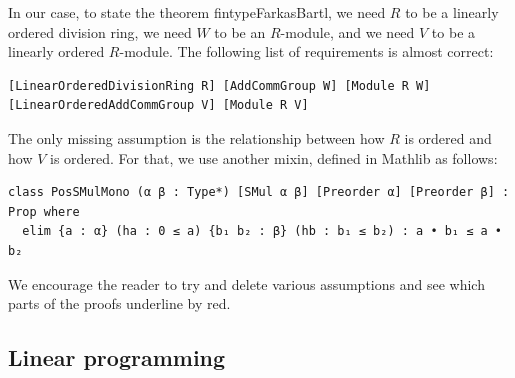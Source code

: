 \documentclass[]{article}
\renewcommand{\.}{\hskip .75pt}
\begin{document}
In our case, to state the theorem fintypeFarkasBartl,
we need $R$ to be a linearly ordered division ring,
we need $W$ to be an $R$-module, and
we need $V$ to be a linearly ordered $R$-module.
The following list of requirements is almost correct:
\begin{lstlisting}
[LinearOrderedDivisionRing R] [AddCommGroup W] [Module R W] [LinearOrderedAddCommGroup V] [Module R V]
\end{lstlisting}
The only missing assumption is the relationship between how $R$ is ordered and how $V$ is ordered.
For that, we use another mixin, defined in Mathlib as follows:
\begin{lstlisting}
class PosSMulMono (α β : Type*) [SMul α β] [Preorder α] [Preorder β] : Prop where
  elim {a : α} (ha : 0 ≤ a) {b₁ b₂ : β} (hb : b₁ ≤ b₂) : a • b₁ ≤ a • b₂
\end{lstlisting}
We encourage the reader to try and delete various assumptions and see which parts of the proofs
underline by red.

\subsection{Linear programming}
\end{document}

